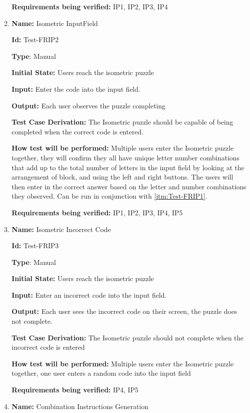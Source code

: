 \documentclass[12pt, titlepage]{article}
\begin{document}
\begin{enumerate}
\textbf{Requirements being verified: } IP1, IP2, IP3, IP4

\item{\textbf{Name:} Isometric InputField} \label{itm:Test-FRIP2}

\textbf{Id:} Test-FRIP2

\textbf{Type}: Manual

\textbf{Initial State:} Users reach the isometric puzzle

\textbf{Input:} Enter the code into the input field.

\textbf{Output:} Each user observes the puzzle completing

\textbf{Test Case Derivation:} The Isometric puzzle should be capable of being completed when the correct code is entered.

\textbf{How test will be performed:} Multiple users enter the Isometric puzzle together, they will confirm they all have unique letter number combinations that add up to the total number of letters in the input field by looking at the arrangement of block, and using the left and right buttons. The users will then enter in the correct answer based on the letter and number combinations they observed. Can be run in conjunction with \ref{itm:Test-FRIP1}.

\textbf{Requirements being verified: } IP1, IP2, IP3, IP4, IP5

\item{\textbf{Name:} Isometric Incorrect Code} \label{itm:Test-FRIP3}

\textbf{Id:} Test-FRIP3

\textbf{Type}: Manual

\textbf{Initial State:} Users reach the isometric puzzle

\textbf{Input:} Enter an incorrect code into the input field.

\textbf{Output:} Each user sees the incorrect code on their screen, the puzzle does not complete.

\textbf{Test Case Derivation:} The Isometric puzzle should not complete when the incorrect code is entered

\textbf{How test will be performed:} Multiple users enter the Isometric puzzle together, one user enters a random code into the input field

\textbf{Requirements being verified: } IP4, IP5

\item{\textbf{Name:} Combination Instructions Generation} \label{itm:Test-FRCP1}


\end{enumerate}
\end{document}
